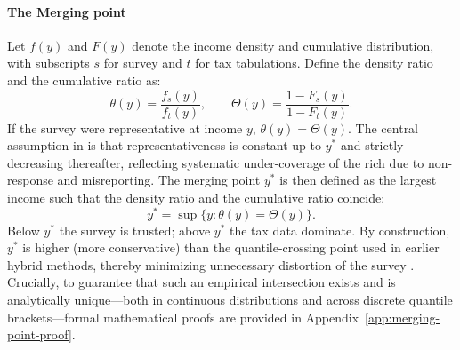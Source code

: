 \paragraph{The Merging point}\label{sec:bfm-merging}
Let $f(y)$ and $F(y)$ denote the income density and cumulative distribution, with subscripts $s$ for survey and $t$ for tax tabulations. Define the density ratio and the cumulative ratio as:
\begin{equation}
    \theta(y) = \frac{f_{s}(y)}{f_{t}(y)}, \qquad \Theta(y) = \frac{1-F_{s}(y)}{1-F_{t}(y)}.
    \label{eq:theta-Theta}
\end{equation}
If the survey were representative at income $y$, $\theta(y)=\Theta(y)$. The central assumption in \citet{blanchet2022weight} is that representativeness is constant up to $y^{*}$ and strictly decreasing thereafter, reflecting systematic under-coverage of the rich due to non-response and misreporting. The merging point $y^{*}$ is then defined as the largest income such that the density ratio and the cumulative ratio coincide:
\begin{equation}
    y^{*} = \sup \{ y : \theta(y) = \Theta(y) \}.
    \label{eq:merging-point}
\end{equation}
Below $y^{*}$ the survey is trusted; above $y^{*}$ the tax data dominate. By construction, $y^{*}$ is higher (more conservative) than the quantile-crossing point used in earlier hybrid methods, thereby minimizing unnecessary distortion of the survey \citep[see Appendix~A.3 in][]{blanchet2022weight}. Crucially, to guarantee that such an empirical intersection exists and is analytically unique—both in continuous distributions and across discrete quantile brackets—formal mathematical proofs are provided in Appendix~\ref{app:merging-point-proof}.

